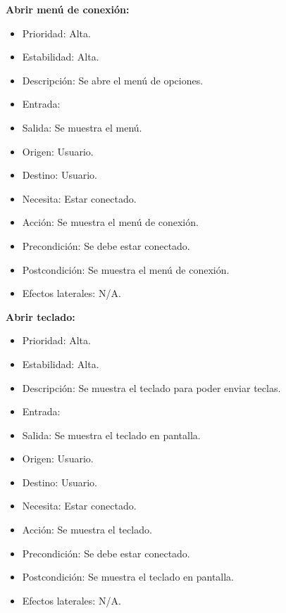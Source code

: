\textbf{Abrir menú de conexión:}
\begin{itemize}
\item Prioridad: Alta.
\item Estabilidad: Alta.
\item Descripción: Se abre el menú de opciones.
\item Entrada:
\item Salida: Se muestra el menú.
\item Origen: Usuario.
\item Destino: Usuario.
\item Necesita: Estar conectado.
\item Acción: Se muestra el menú de conexión.
\item Precondición: Se debe estar conectado.
\item Postcondición: Se muestra el menú de conexión.
\item Efectos laterales: N/A.\\

\end{itemize}

\textbf{Abrir teclado:}
\begin{itemize}
\item Prioridad: Alta.
\item Estabilidad: Alta.
\item Descripción: Se muestra el teclado para poder enviar teclas.
\item Entrada:
\item Salida: Se muestra el teclado en pantalla.
\item Origen: Usuario.
\item Destino: Usuario.
\item Necesita: Estar conectado.
\item Acción: Se muestra el teclado.
\item Precondición: Se debe estar conectado.
\item Postcondición: Se muestra el teclado en pantalla.
\item Efectos laterales: N/A.\\

\end{itemize}

